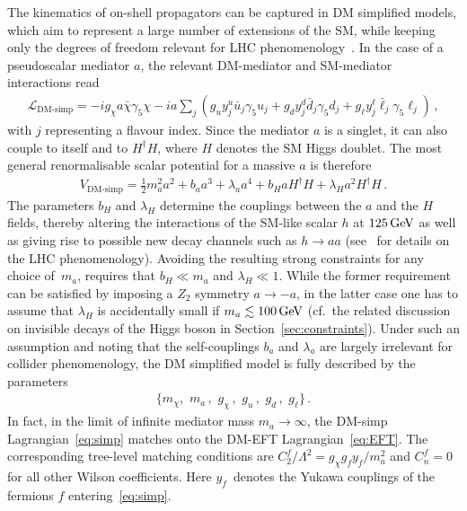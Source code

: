 \documentclass[a4paper, 11pt,notoc]{article}
\begin{document}
The kinematics of on-shell propagators can be captured in DM simplified models, which aim to represent a large number of extensions of the SM, while keeping only the degrees of freedom relevant for LHC phenomenology~\cite{Abdallah:2015ter,Abercrombie:2015wmb}. In the case of a pseudoscalar mediator $a$, the relevant DM-mediator and SM-mediator interactions read
\begin{align}\label{eq:simp}
\mathcal{L}_\text{DM-simp}=-i g_\chi a\bar \chi \gamma_5 \chi -i a \sum_j \left(g_u y_j^u \bar u_j \gamma_5 u_j + g_d y_j^d \bar d_j \gamma_5 d_j + g_\ell y_j^\ell \bar \ell_j\gamma_5 \ell_j  \right) \,,
\end{align}
with  $j$ representing a flavour index.  Since the mediator $a$ is a singlet, it can also couple to itself and to $H^\dagger H$, where $H$ denotes  the SM Higgs doublet. The most general renormalisable scalar potential for a massive $a$ is therefore
\begin{align}\label{eq:VaH}
V_\text{DM-simp} =\frac{1}{2}m_a^2 a^2 +  b_a a^3 + \lambda_a a^4 + b_{H} a H^\dagger H +\lambda_{H} a^2H^\dagger H \,.
\end{align}
The parameters $ b_{H}$  and $\lambda_{H}$ determine the couplings between the $a$ and the $H$ fields, thereby altering  the interactions  of the SM-like scalar $h$ at $125 \, {\rm GeV}$ as well as giving rise to possible new decay channels such as $h \to aa$ (see~\cite{Curtin:2013fra,Haisch:2018kqx} for details on the LHC phenomenology). Avoiding the resulting strong constraints for any choice of~$m_a$, requires that  $b_H \ll m_a $ and $\lambda_H \ll 1$. While the former requirement can be satisfied by imposing a $Z_2$ symmetry $a \to -a$, in the latter case one has to assume that $\lambda_H$ is accidentally small if $m_a \lesssim 100 \, {\rm GeV}$ (cf.~the related discussion on invisible decays of the Higgs boson in Section~\ref{sec:constraints}). Under such an assumption and noting that the self-couplings $b_a$ and $\lambda_a$ are largely irrelevant for collider phenomenology, the DM simplified model is  fully described by the parameters 
\begin{align}
\big\{ m_\chi, \,\, m_a\,,\,\, g_\chi\,, \,\, g_u\,,\,\,g_d\,,\,\, g_\ell \big\}\,. 
\end{align}
In fact, in the  limit of infinite mediator mass $m_a \to \infty$,  the DM-simp Lagrangian~\eqref{eq:simp} matches onto the DM-EFT Lagrangian~\eqref{eq:EFT}. The corresponding tree-level matching conditions are $C^f_2/\Lambda^2 = g_\chi g_f y_f  /m_a^2$ and $C_n^f=0$ for all other Wilson coefficients. Here $y_f$~denotes the Yukawa couplings of the fermions $f$ entering~\eqref{eq:simp}.
\end{document}
